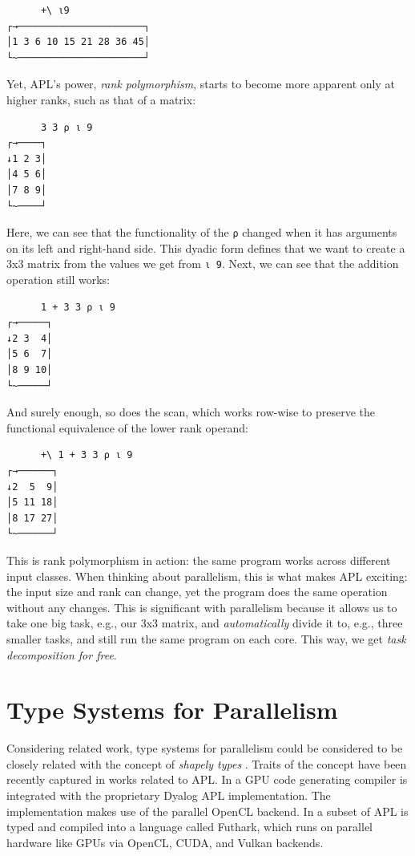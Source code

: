 \documentclass{report}
\begin{document}
\begin{verbatim}
      +\ ⍳9
┌→──────────────────────┐
│1 3 6 10 15 21 28 36 45│
└~──────────────────────┘
\end{verbatim}

Yet, APL's power, \emph{rank polymorphism}, starts to become more apparent only at higher ranks, such as that of a matrix:

\begin{verbatim}
      3 3 ⍴ ⍳ 9
┌→────┐
↓1 2 3│
│4 5 6│
│7 8 9│
└~────┘    
\end{verbatim}

Here, we can see that the functionality of the \verb|⍴| changed when it has arguments on its left and right-hand side. This dyadic form defines that we want to create a 3x3 matrix from the values we get from \verb|⍳ 9|. Next, we can see that the addition operation still works:

\begin{verbatim}
      1 + 3 3 ⍴ ⍳ 9
┌→─────┐
↓2 3  4│
│5 6  7│
│8 9 10│
└~─────┘
\end{verbatim}

And surely enough, so does the scan, which works row-wise to preserve the functional equivalence of the lower rank operand:

\begin{verbatim}
      +\ 1 + 3 3 ⍴ ⍳ 9
┌→──────┐
↓2  5  9│
│5 11 18│
│8 17 27│
└~──────┘
\end{verbatim}

This is rank polymorphism in action: the same program works across different input classes. When thinking about parallelism, this is what makes APL exciting: the input size and rank can change, yet the program does the same operation without any changes. This is significant with parallelism because it allows us to take one big task, e.g., our 3x3 matrix, and \emph{automatically} divide it to, e.g., three smaller tasks, and still run the same program on each core. This way, we get \emph{task decomposition for free}.

\section{Type Systems for Parallelism}

Considering related work, type systems for parallelism could be considered to be closely related with the concept of \emph{shapely types} \cite{jay1994shapely, shkaravska2007polynomial}. Traits of the concept have been recently captured in works related to APL. In \cite{hsu2019phd} a GPU code generating compiler is integrated with the proprietary Dyalog APL implementation. The implementation makes use of the parallel OpenCL backend. In \cite{Henriksen:2016:AGT:2975991.2975997} a subset of APL is typed and compiled into a language called Futhark, which runs on parallel hardware like GPUs via OpenCL, CUDA, and Vulkan backends.
\end{document}
